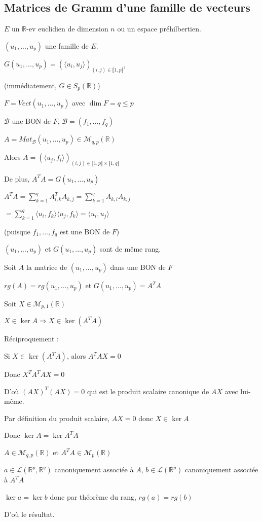 \documentclass[a4paper,12pt]{book}
\newcommand{\Def}[2]{\begin{tcolorbox}[sharp corners, colback=white,colframe=blue!90!black!75, title=Définition : #1]#2\end{tcolorbox}}
\newcommand{\Prop}[2]{\begin{tcolorbox}[sharp corners, colback=white,colframe=red!90!black!75, title=Proposition : #1]#2\end{tcolorbox}}
\newcommand{\Pre}[1]{\begin{tcolorbox}[sharp corners, colback=white,colframe=green!60!green!30!black!75, title=Preuve]#1\end{tcolorbox}}
\def\R{\mathbb{R}}
\begin{document}
\subsection{Matrices de Gramm d'une famille de vecteurs}
\Def{}{$E$ un $\R$-ev euclidien de dimension $n$ ou un espace préhilbertien.
\par $(u_1,..., u_p)$ une famille de $E$.
\par $G(u_1,..., u_p)  = (\langle u_i, u_j\rangle)_{(i,j)\in\llbracket 1,p\rrbracket^2}$
\par (immédiatement, $G\in S_p(\R)$)}
\Prop{}{$F=Vect(u_1,..., u_p)$ avec $\dim F = q \leq p$
\par $\mathcal{B}$ une BON de $F$, $\mathcal{B}=(f_1,...,f_q)$
\par $A =Mat_\mathcal{B}(u_1,...,u_p)\in\mathcal{M}_{q,p}(\R)$
\par Alors $A = (\langle u_j, f_i\rangle)_{(i,j)\in\llbracket 1,p\rrbracket\times\llbracket 1,q\rrbracket}$
\par De plus, $A^TA = G(u_1,..., u_p)$}
\Pre{$A^TA = \sum\limits_{k=1}^qA_{i,k}^TA_{k,j} = \sum\limits_{k=1}^qA_{k,i}A_{k,j}$
\par $ = \sum\limits_{k=1}^q\langle u_i, f_k\rangle\langle u_j, f_k\rangle = \langle u_i, u_j\rangle$
\par (puisque $f_1,...,f_q$ est une BON de $F$)}
\Prop{Corollaire}{$(u_1,...,u_p)$ et $G(u_1,...,u_p)$ sont de même rang.}
\Pre{Soit $A$ la matrice de $(u_1,..., u_p)$ dans une BON de $F$
\par $rg(A) = rg(u_1,..., u_p)$ et $G(u_1,..., u_p)=A^TA$
\par Soit $X\in\mathcal{M}_{p,1}(\R)$
\par $X\in \ker A\Rightarrow X\in\ker(A^TA)$
\par Réciproquement :
\par Si $X\in\ker(A^TA)$, alors $A^TAX = 0$
\par Donc $X^TA^TAX=0$
\par D'où $(AX)^T(AX)=0$ qui est le produit scalaire canonique de $AX$ avec lui-même.
\par Par définition du produit scalaire, $AX=0$ donc $X\in \ker A$
\par Donc $\ker A=\ker A^TA$
\par $A\in\mathcal{M}_{q,p}(\R)$ et $A^TA\in\mathcal{M}_p(\R)$
\par $a\in\mathcal{L}(\R^p,\R^q)$ canoniquement associée à $A$, $b\in\mathcal{L}(\R^p)$ canoniquement associée à $A^TA$
\par $\ker a=\ker b$ donc par théorème du rang, $rg (a)= rg (b)$
\par D'où le résultat.}
\end{document}
